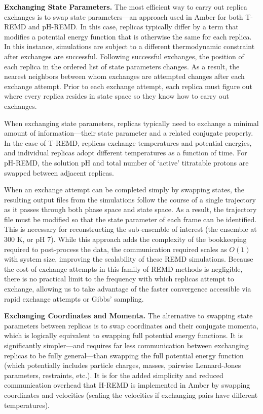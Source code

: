 \textbf{Exchanging State Parameters.} The most efficient way to carry out
replica exchanges is to swap state parameters---an approach used in Amber for
both T-REMD and pH-REMD. In this case, replicas typically differ by a term that
modifies a potential energy function that is otherwise the same for each
replica. In this instance, simulations are subject to a different thermodynamic
constraint after exchanges are successful. Following successful exchanges, the
position of each replica in the ordered list of state parameters changes. As a
result, the nearest neighbors between whom exchanges are attempted changes after
each exchange attempt.  Prior to each exchange attempt, each replica must figure
out where every replica resides in state space so they know how to carry out
exchanges.

When exchanging state parameters, replicas typically need to exchange a minimal
amount of information---their state parameter and a related conjugate property.
In the case of T-REMD, replicas exchange temperatures and potential energies,
and individual replicas adopt different temperatures as a function of time. For
pH-REMD, the solution pH and total number of `active' titratable protons are
swapped between adjacent replicas.

When an exchange attempt can be completed simply by swapping states, the
resulting output files from the simulations follow the course of a single
trajectory as it passes through both phase space and state space. As a result,
the trajectory file must be modified so that the state parameter of each frame
can be identified. This is necessary for reconstructing the sub-ensemble of
interest (\eg the ensemble at 300 K, or pH 7). While this approach adds the
complexity of the bookkeeping required to post-process the data, the
communication required scales as $O(1)$ with system size, improving the
scalability of these REMD simulations.
\cite{Swails_JChemTheoryComput_2012_v8_p4393} Because the cost of exchange
attempts in this family of REMD methods is negligible, there is no practical
limit to the frequency with which replicas attempt to exchange, allowing us to
take advantage of the faster convergence accessible via rapid exchange attempts
\cite{Sindhikara2008, Sindhikara2010} or Gibbs' sampling.
\cite{Chodera_JChemPhys_2011_v135_p194110}

\textbf{Exchanging Coordinates and Momenta.} The alternative to swapping state
parameters between replicas is to swap coordinates and their conjugate momenta,
which is logically equivalent to swapping full potential energy functions. It is
significantly simpler---and requires far less communication between exchanging
replicas to be fully general---than swapping the full potential energy function
(which potentially includes particle charges, masses, pairwise Lennard-Jones
parameters, restraints, etc.).  It is for the added simplicity and reduced
communication overhead that H-REMD is implemented in Amber by swapping
coordinates and velocities (scaling the velocities if exchanging pairs have
different temperatures). \cite{Meng_JChemTheoryComput_2011_v7_p2721}

